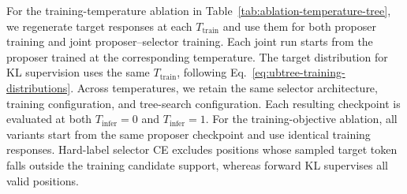 For the training-temperature ablation in Table~\ref{tab:ablation-temperature-tree}, we regenerate target responses at each $T_{\mathrm{train}}$ and use them for both proposer training and joint proposer--selector training. Each joint run starts from the proposer trained at the corresponding temperature. The target distribution for KL supervision uses the same $T_{\mathrm{train}}$, following Eq.~\eqref{eq:ubtree-training-distributions}. Across temperatures, we retain the same selector architecture, training configuration, and tree-search configuration. Each resulting checkpoint is evaluated at both $T_{\mathrm{infer}}=0$ and $T_{\mathrm{infer}}=1$. For the training-objective ablation, all variants start from the same proposer checkpoint and use identical training responses. Hard-label selector CE excludes positions whose sampled target token falls outside the training candidate support, whereas forward KL supervises all valid positions.

\FloatBarrier
